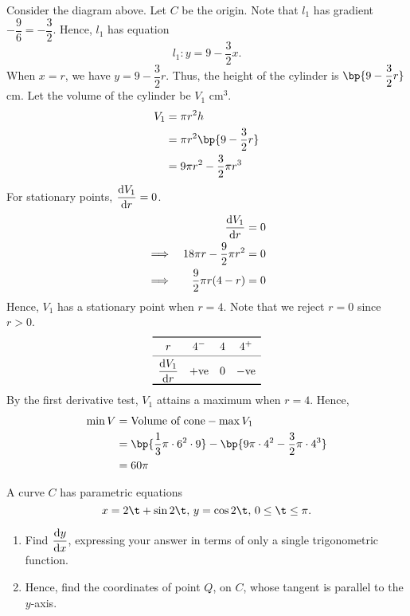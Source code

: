 \documentclass{echw}
\begin{document}
        Consider the diagram above. Let $C$ be the origin. Note that $l_1$ has gradient $-\dfrac96 = -\dfrac32$. Hence, $l_1$ has equation \[l_1: y = 9 - \dfrac32 x.\] When $x = r$, we have $y = 9 - \dfrac32 r$. Thus, the height of the cylinder is $\bp{9 - \dfrac32 r}$ cm. Let the volume of the cylinder be $V_1$ cm$^3$.
        \begin{align*}
            V_1 &= \pi r^2 h\\
            &= \pi r^2 \bp{9 - \dfrac32 r}\\
            &= 9\pi r^2 - \dfrac32 \pi r^3
        \end{align*}
        For stationary points, $\dfrac{\mathrm{d} V_1}{\mathrm{d} r} = 0$.
        \begin{alignat*}{2}
            &&\dfrac{\mathrm{d} V_1}{\mathrm{d} r} &= 0\\
            \implies&&18\pi r - \dfrac92 \pi r^2 &= 0\\
            \implies&&\dfrac92 \pi r (4 - r) &= 0
        \end{alignat*}
        Hence, $V_1$ has a stationary point when $r = 4$. Note that we reject $r = 0$ since $r > 0$.
        \[
        \begin{array}{c c c c}\toprule
            r & 4^- & 4 & 4^+ \\\cmidrule{1-4}
            \der{V_1}{r} & +\text{ve} & 0 & -\text{ve}\\\bottomrule
        \end{array}
        \]
        By the first derivative test, $V_1$ attains a maximum when $r = 4$. Hence,
        \begin{align*}
            \min V &= \text{Volume of cone} - \max V_1\\
            &= \bp{\dfrac13 \pi \cdot 6^2 \cdot 9} - \bp{9\pi \cdot 4^2 - \dfrac32 \pi \cdot 4^3}\\
            &= 60\pi
        \end{align*}

    \problem{}
        A curve $C$ has parametric equations \[x = 2\t + \sin 2\t, \, y = \cos 2\t, \, 0 \leq \t \leq \pi.\]

        \begin{enumerate}
            \item Find $\dfrac{\mathrm{d} y}{\mathrm{d} x}$, expressing your answer in terms of only a single trigonometric function.
            \item Hence, find the coordinates of point $Q$, on $C$, whose tangent is parallel to the $y$-axis.
        \end{enumerate}
\end{document}
